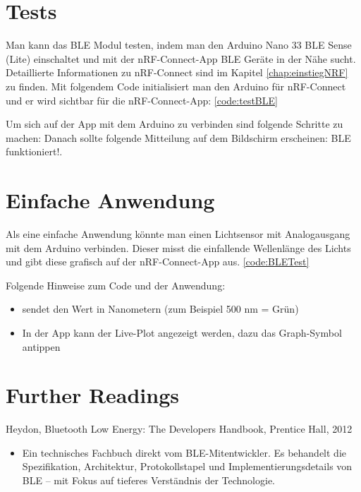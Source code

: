 \section{Tests}
Man kann das BLE Modul testen, indem man den Arduino Nano 33 BLE Sense (Lite) einschaltet und mit der nRF-Connect-App BLE Geräte in der Nähe sucht. Detaillierte Informationen zu nRF-Connect sind im Kapitel \ref{chap:einstiegNRF} zu finden. Mit folgendem Code initialisiert man den Arduino für nRF-Connect und er wird sichtbar für die nRF-Connect-App: \ref{code:testBLE}

{
	\label{code:testBLE}
}

Um sich auf der App mit dem Arduino zu verbinden sind folgende Schritte zu machen:
Danach sollte folgende Mitteilung auf dem Bildschirm erscheinen: \glqq BLE funktioniert!\grqq.

\section{Einfache Anwendung}
Als eine einfache Anwendung könnte man einen Lichtsensor mit Analogausgang mit dem Arduino verbinden. Dieser misst die einfallende Wellenlänge des Lichts und gibt diese grafisch auf der nRF-Connect-App aus. \ref{code:BLETest}

{
	\lstset{breaklines=true, breakatwhitespace=true}
	\label{code:BLETest}
}

Folgende Hinweise zum Code und der Anwendung:

\begin{itemize}
	\item {} sendet den Wert in Nanometern (zum Beispiel 500 nm = Grün)
	\item In der App kann der Live-Plot angezeigt werden, dazu das Graph-Symbol antippen
\end{itemize}

\section{Further Readings}

Heydon, Bluetooth Low Energy: The Developers Handbook, Prentice Hall, 2012 \cite{Heydon:2012}

\begin{itemize}
	\item Ein technisches Fachbuch direkt vom BLE-Mitentwickler. Es behandelt die Spezifikation, Architektur, Protokollstapel und Implementierungsdetails von BLE – mit Fokus auf tieferes Verständnis der Technologie.
\end{itemize} 

